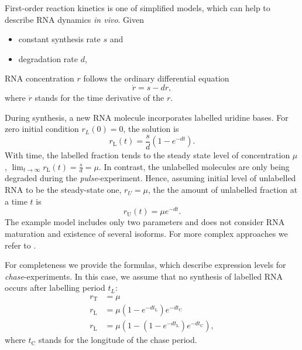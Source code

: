 First-order reaction kinetics  is one of simplified models,
which can help to describe RNA dynamics \emph{in vivo}\cite{A}.
Given
\begin{itemize}
 \item constant synthesis rate $s$ and
\item degradation rate $d$, 
\end{itemize}
RNA concentration $r$ follows the ordinary differential equation
\begin{equation}
 \dot{r} = s - dr,
\end{equation}
where $\dot{r}$ stands for the time derivative of the $r$\cite{A}.
\par
During synthesis, a new RNA molecule incorporates labelled uridine bases\cite{A}.
For zero initial condition $r_L(0) = 0$, the solution is
\begin{equation}
 r_\text{L}(t) = \frac{s}{d}\left(1 - e^{-dt}\right).
\end{equation}
With time, the labelled fraction tends to the steady state level of concentration $\mu$,
$\lim_{t\to\infty} r_\text{L}(t) = \frac{s}{d} = \mu$.
In contrast, the unlabelled molecules are only being degraded during the \emph{pulse}-experiment.
Hence, assuming initial level of unlabelled RNA to be the steady-state one, $r_U = \mu$,
the the amount of unlabelled fraction at a time $t$ is
\begin{equation}
 r_\text{U}(t) = \mu e^{-dt}.
\end{equation}
The example model includes only two parameters and does not consider
RNA maturation and existence of several isoforms. For more complex approaches we refer to \cite{A}.
\par For completeness we provide the formulas, which describe expression levels for \emph{chase}-experiments.
In this case, we assume that no synthesis of labelled RNA occurs after labelling period $t_L$:
\begin{align}
 r_\text{T}&=\mu\\
 r_\text{L}&=\mu \left(1-e^{-dt_\text{L}}\right)e^{-dt_\text{C}}\\
 r_\text{L}&=\mu \left(1-\left(1-e^{-dt_\text{L}}\right)e^{-dt_\text{C}}\right),
\end{align}
where $t_\text{C}$ stands for the longitude of the chase period.

